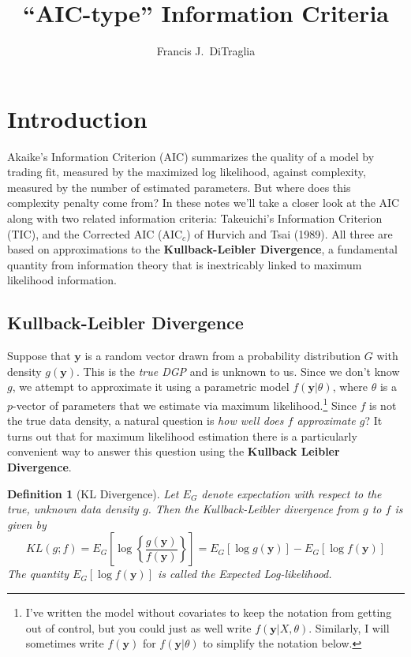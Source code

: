 \documentclass[12pt]{article}
\newtheorem{defn}{Definition}[section]
\theoremstyle{definition}
\begin{document}
\title{``AIC-type'' Information Criteria}

\author{Francis J.\ DiTraglia}

\maketitle 

 

\section{Introduction}
Akaike's Information Criterion (AIC) summarizes the quality of a model by trading fit, measured by the maximized log likelihood, against complexity, measured by the number of estimated parameters. But where does this complexity penalty come from? In these notes we'll take a closer look at the AIC along with two related information criteria: Takeuichi's Information Criterion (TIC), and the Corrected AIC (AIC$_c$) of Hurvich and Tsai (1989). All three are based on approximations to the \textbf{Kullback-Leibler Divergence}, a fundamental quantity from information theory that is inextricably linked to maximum likelihood information. 


\subsection{Kullback-Leibler Divergence}
Suppose that $\mathbf{y}$ is a random vector drawn from a probability distribution $G$ with density $g(\mathbf{y})$. This is the \emph{true DGP} and is unknown to us. Since we don't know $g$, we attempt to approximate it using a parametric model $f(\mathbf{y}|\theta)$, where $\theta$ is a $p$-vector of parameters that we estimate via maximum likelihood.\footnote{I've written the model without covariates to keep the notation from getting out of control, but you could just as well write $f(\mathbf{y}|X,\theta)$. Similarly, I will sometimes write $f(\mathbf{y})$ for $f(\mathbf{y}|\theta)$ to simplify the notation below. } Since $f$ is not the true data density, a natural question is \emph{how well does $f$ approximate $g$}? It turns out that for maximum likelihood estimation there is a particularly convenient way to answer this question using the \textbf{Kullback Leibler Divergence}.


\begin{defn}[KL Divergence]
Let $E_G$ denote expectation with respect to the true, unknown data density $g$. Then the Kullback-Leibler divergence from $g$ to $f$ is given by
	$$KL(g;f) = E_G \left[ \log{\left\{\frac{g(\textbf{y})}{f(\textbf{y})}\right\}}\right]= E_G\left[ \log{g(\textbf{y})}\right] - E_G\left[ \log{f(\textbf{y})} \right]$$
The quantity $E_G\left[ \log{f(\mathbf{y})} \right]$ is called the Expected Log-likelihood.
\end{defn}
\end{document}
